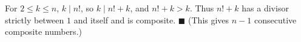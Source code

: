 For $2\le k\le n$, $k\mid n!$, so $k\mid n!+k$, and $n!+k>k$. Thus $n!+k$ has a divisor strictly between $1$ and itself and is composite. $\blacksquare$ (This gives $n-1$ consecutive composite numbers.)

